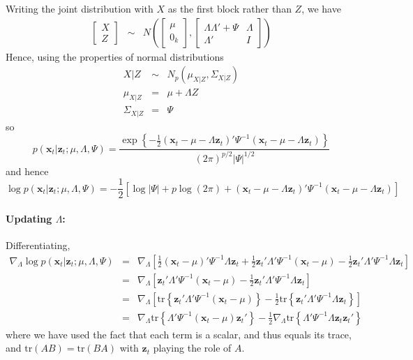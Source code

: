 Writing the joint distribution with $X$ as the first block rather than $Z$, we have
	\begin{eqnarray*}
		\left[\begin{array}{c}
			X\\ Z
		\end{array}\right] 
		&\sim&  N\left(
		\left[\begin{array}{c}
			 \mu \\ 0_k 
	\end{array}\right], 
		\left[\begin{array}{cc}
			 \Lambda \Lambda' + \Psi & \Lambda\\
			 \Lambda' & I
		\end{array} \right] \right)
	\end{eqnarray*}
Hence, using the properties of normal distributions
	\begin{eqnarray*}
		X | Z &\sim& N_p(\mu_{X|Z}, \Sigma_{X|Z})\\
		\mu_{X|Z} &=& \mu + \Lambda Z \\
		\Sigma_{X|Z} &=& \Psi
	\end{eqnarray*}
so 
	$$p(\textbf{x}_t| \textbf{z}_t;\mu, \Lambda, \Psi) = \frac{\exp \left\{-\frac{1}{2}(\mathbf{x}_t - \mu -  \Lambda \textbf{z}_t)' \Psi^{-1} (\mathbf{x}_t - \mu -  \Lambda \textbf{z}_t) \right\}}{{(2\pi)^{p/2}\left|\Psi \right|^{1/2}}}$$
and hence
	$$\log p(\textbf{x}_t| \textbf{z}_t;\mu, \Lambda, \Psi) = -\frac{1}{2}\left[  \log |\Psi| + p \log(2\pi) +(\mathbf{x}_t - \mu -  \Lambda \textbf{z}_t)' \Psi^{-1} (\mathbf{x}_t - \mu -  \Lambda \textbf{z}_t)\right] $$


\paragraph{Updating $\Lambda$:}
Differentiating, 
	\begin{eqnarray*}
		\nabla_\Lambda \log p(\textbf{x}_t| \textbf{z}_t;\mu, \Lambda, \Psi) &=&  \nabla_\Lambda \left[ \frac{1}{2}(\mathbf{x}_t - \mu)' \Psi^{-1} \Lambda \mathbf{z}_t + \frac{1}{2} \mathbf{z}_t' \Lambda'\Psi^{-1} (\mathbf{x}_t - \mu)- \frac{1}{2} \mathbf{z}_t' \Lambda' \Psi^{-1} \Lambda \mathbf{z}_t \right] \\
		&=& \nabla_\Lambda \left[  \mathbf{z}_t' \Lambda'\Psi^{-1} (\mathbf{x}_t - \mu)- \frac{1}{2} \mathbf{z}_t' \Lambda' \Psi^{-1} \Lambda \mathbf{z}_t \right]\\
		&=& \nabla_\Lambda \left[  \mbox{tr}\left\{\mathbf{z}_t' \Lambda'\Psi^{-1} (\mathbf{x}_t - \mu)\right\}- \frac{1}{2} \mbox{tr}\left\{ \mathbf{z}_t' \Lambda' \Psi^{-1} \Lambda \mathbf{z}_t \right\}\right]\\
		&=& \nabla_\Lambda \mbox{tr}\left\{ \Lambda'\Psi^{-1} (\mathbf{x}_t - \mu)\mathbf{z}_t'\right\}- \frac{1}{2} \nabla_\Lambda \mbox{tr}\left\{  \Lambda' \Psi^{-1} \Lambda \mathbf{z}_t \mathbf{z}_t'\right\}
	\end{eqnarray*}
where we have used the fact that each term is a scalar, and thus equals its trace, and $\mbox{tr}(AB) = \mbox{tr}(BA)$ with $\mathbf{z}_t$ playing the role of $A$.

